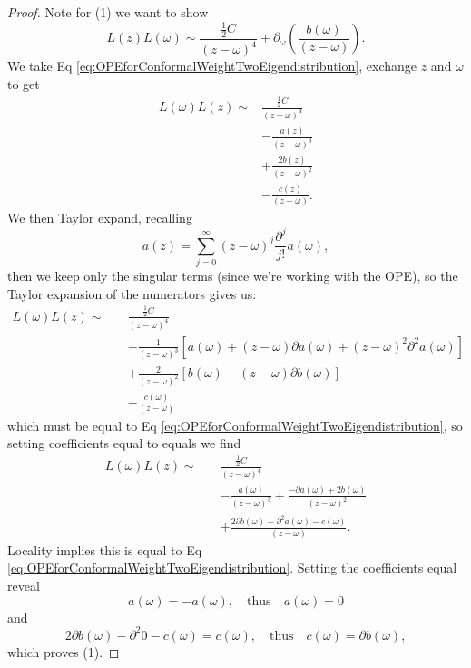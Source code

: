\begin{proof}
Note for (1) we want to show
\begin{equation}
L(z)L(\omega)\sim\frac{\frac{1}{2}C}{(z-\omega)^{4}}
+\partial_{\omega}\left(\frac{b(\omega)}{(z-\omega)}\right).
\end{equation}
We take Eq \eqref{eq:OPEforConformalWeightTwoEigendistribution}, exchange
$z$ and $\omega$ to get
\begin{equation}
\begin{split}
L(\omega)L(z)\sim&\frac{\frac{1}{2}C}{(z-\omega)^{4}}\\
  &- \frac{a(z)}{(z-\omega)^{3}}\\
  &+\frac{2b(z)}{(z-\omega)^{2}}\\
  &-\frac{c(z)}{(z-\omega)}.
\end{split}
\end{equation}
We then Taylor expand, recalling
\begin{equation*}
a(z)=\sum^{\infty}_{j=0}(z-\omega)^{j}\frac{\partial^{j}}{j!}a(\omega),
\end{equation*}
then we keep only the singular terms (since we're working with the OPE), so
the Taylor expansion of the numerators gives us:
\begin{equation}
\begin{split}
L(\omega)L(z)
\sim\quad&\frac{\frac{1}{2}C}{(z-\omega)^{4}}\\
&-\frac{1}{(z-\omega)^{3}}\left[a(\omega)+(z-\omega)\partial a(\omega)+(z-\omega)^{2}\partial^{2}a(\omega)\right]\\
&+\frac{2}{(z-\omega)^{2}}\left[ b(\omega)+(z-\omega)\partial b(\omega)\right]\\
&-\frac{c(\omega)}{(z-\omega)}
\end{split}
\end{equation}
which must be equal to Eq \eqref{eq:OPEforConformalWeightTwoEigendistribution},
so setting coefficients equal to equals we find
\begin{equation}
\begin{split}
L(\omega)L(z)
\sim\quad&\frac{\frac{1}{2}C}{(z-\omega)^{4}}\\
&-\frac{a(\omega)}{(z-\omega)^{3}}+\frac{-\partial a(\omega) + 2b(\omega)}{(z-\omega)^{2}}\\
&+\frac{2\partial b(\omega)-\partial^{2}a(\omega)-c(\omega)}{(z-\omega)}.
\end{split}
\end{equation}
Locality implies this is equal to Eq \eqref{eq:OPEforConformalWeightTwoEigendistribution}.
Setting the coefficients equal reveal
\begin{equation}
a(\omega)=-a(\omega),\quad\mbox{thus}\quad a(\omega)=0
\end{equation}
and
\begin{equation}
2\partial b(\omega)-\partial^{2}0-c(\omega)=c(\omega),\quad\mbox{thus}\quad
c(\omega)=\partial b(\omega),
\end{equation}
which proves (1).


\end{proof}
